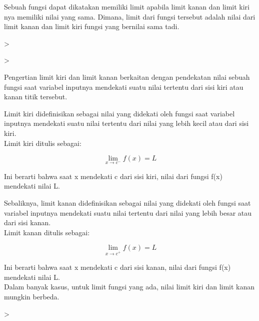 \documentclass[a4paper,10pt]{article}
\begin{document}
\begin{eulernotebook}
\begin{eulercomment}
\begin{eulercomment}
\begin{eulercomment}
\begin{eulercomment}
\begin{eulercomment}
\begin{eulercomment}
Sebuah fungsi dapat dikatakan memiliki limit apabila limit kanan dan
limit kiri nya memiliki nilai yang sama. Dimana, limit dari fungsi
tersebut adalah nilai dari limit kanan dan limit kiri fungsi yang
bernilai sama tadi.
\end{eulercomment}
\begin{eulerprompt}
>                                                   
\end{eulerprompt}
\begin{eulerudf}
     
\end{eulerudf}
\begin{eulerprompt}
>     
\end{eulerprompt}
\begin{eulercomment}
Pengertian limit kiri dan limit kanan berkaitan dengan pendekatan
nilai sebuah fungsi saat variabel inputnya mendekati suatu nilai
tertentu dari sisi kiri atau kanan titik tersebut.


Limit kiri didefinisikan sebagai nilai yang didekati oleh fungsi saat
variabel inputnya mendekati suatu nilai tertentu dari nilai yang lebih
kecil atau dari sisi kiri.\\
Limit kiri ditulis sebagai:

\end{eulercomment}
\begin{eulerformula}
\[
\lim \limits_{x \to c^-} {f(x)} = L
\]
\end{eulerformula}
\begin{eulercomment}
Ini berarti bahwa saat x mendekati c dari sisi kiri, nilai dari fungsi
f(x) mendekati nilai L.


Sebaliknya, limit kanan didefinisikan sebagai nilai yang didekati oleh
fungsi saat variabel inputnya mendekati suatu nilai tertentu dari
nilai yang lebih besar atau dari sisi kanan.\\
Limit kanan ditulis sebagai:

\end{eulercomment}
\begin{eulerformula}
\[
\lim \limits_{x \to c^+} {f(x)} = L
\]
\end{eulerformula}
\begin{eulercomment}
Ini berarti bahwa saat x mendekati c dari sisi kanan, nilai dari
fungsi f(x) mendekati nilai L.\\
Dalam banyak kasus, untuk limit fungsi yang ada, nilai limit kiri dan
limit kanan mungkin berbeda.
\end{eulercomment}
\begin{eulerprompt}
>                        
\end{eulerprompt}
\begin{eulerudf}
   

\end{eulerudf}
\end{eulercomment}
\end{eulercomment}
\end{eulercomment}
\end{eulercomment}
\end{eulercomment}
\end{eulernotebook}
\end{document}
